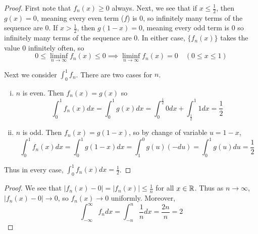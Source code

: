 \documentclass[11pt]{article}
\begin{document}
\begin{exercise}{11.5}
    \begin{proof}
        First note that $f_n(x) \ge 0$ always. Next, we see that if $x \le \frac{1}{2}$, then $g(x) = 0$, meaning every even term ($f$) is $0$, so infinitely many terms of the sequence are $0$. If $x > \frac{1}{2}$, then $g(1 - x) = 0$, meaning every odd term is $0$ so infinitely many terms of the sequence are $0$. In either case, $\{ f_n (x) \}$ takes the value $0$ infinitely often, so $$0 \le \liminf _{n \to \infty} f_n(x) \le 0 \implies \liminf _{n \to \infty} f_n(x) = 0 \quad (0 \le x \le 1)$$

    Next we consider $\int_0^1 f_n$. There are two cases for $n$. \begin{enumerate} [(i)]
        \item $n$ is even. Then $f_n(x) = g(x)$ so $$\int_0^1 f_n(x) dx = \int_0^1 g(x) dx = \int_0^{\frac{1}{2}} 0 dx + \int_{\frac{1}{2}}^1 1 dx = \frac{1}{2}$$
        \item $n$ is odd. Then $f_n(x) = g(1 - x)$, so by change of variable $u = 1 - x$, $$\int_0^1 f_n(x) dx = \int_0^1 g(1 - x) dx = \int_1^0 g(u) (-du) = \int_0^1 g(u) du = \frac{1}{2}$$
    \end{enumerate}
    Thus in every case, $\int_0^1 f_n(x) dx = \frac{1}{2}$.
    \end{proof}
\end{exercise}

\begin{exercise}{11.6}
    \begin{proof}
        We see that $|f_n(x) - 0| = |f_n(x)| \le \frac{1}{n}$ for all $x \in \mathbb{R}$. Thus as $n \to \infty$, $|f_n(x) - 0| \to 0$, so $f_n(x) \to 0$ uniformly. Moreover, $$\int_{- \infty}^\infty f_n dx =  \int_{-n}^n \frac{1}{n} dx = \frac{2n}{n} = 2$$
    \end{proof}
\end{exercise}
\end{document}
